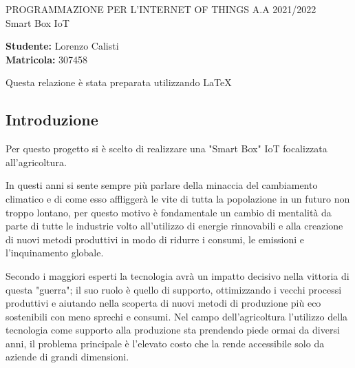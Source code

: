 \documentclass[a4paper, 12pt]{report}
\begin{document}
\begin{titlepage}
  \begin{center}
    \LARGE{PROGRAMMAZIONE PER L'INTERNET OF THINGS A.A 2021/2022} \\
    \vspace{9cm}
    \Huge{Smart Box IoT}
  \end{center}
  \vspace*{\fill}
  \begin{flushright}
    \large{\textbf{Studente:} Lorenzo Calisti} \\
    \large{\textbf{Matricola:} 307458}
  \end{flushright}
  \vspace{1cm}
  \begin{center}
Questa relazione è stata preparata utilizzando \LaTeX
  \end{center}
\end{titlepage}

\subsection*{Introduzione}
\vspace{0.5cm}

Per questo progetto si è scelto di realizzare una "Smart Box" IoT focalizzata all'agricoltura. 

In questi anni si sente sempre più parlare della minaccia del cambiamento climatico e di come esso affliggerà le vite di tutta la popolazione in un futuro non troppo lontano, per questo motivo è fondamentale 
un cambio di mentalità da parte di tutte le industrie volto all'utilizzo di energie rinnovabili e alla creazione di nuovi metodi produttivi in modo di ridurre i consumi, le emissioni e l'inquinamento globale.

Secondo i maggiori esperti la tecnologia avrà un impatto decisivo nella vittoria di questa "guerra"; il suo ruolo è quello di supporto, ottimizzando i vecchi processi produttivi
e aiutando nella scoperta di nuovi metodi di produzione più eco sostenibili con meno sprechi e consumi.
Nel campo dell'agricoltura l'utilizzo della tecnologia come supporto alla produzione sta prendendo piede ormai da diversi anni, il problema principale è l'elevato costo che la rende accessibile solo da aziende di grandi dimensioni.
\end{document}
